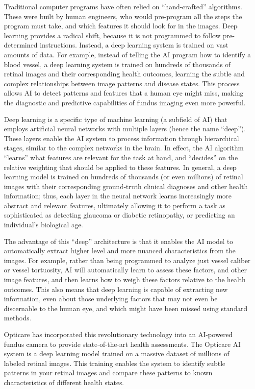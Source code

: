 \documentclass[
  Letterpaper,
]{scrbook}
\begin{document}
Traditional computer programs have often relied on ``hand-crafted''
algorithms. These were built by human engineers, who would pre-program
all the steps the program must take, and which features it should look
for in the images. Deep learning provides a radical shift, because it is
not programmed to follow pre-determined instructions. Instead, a deep
learning system is trained on vast amounts of data. For example, instead
of telling the AI program how to identify a blood vessel, a deep
learning system is trained on hundreds of thousands of retinal images
and their corresponding health outcomes, learning the subtle and complex
relationships between image patterns and disease states. This process
allows AI to detect patterns and features that a human eye might miss,
making the diagnostic and predictive capabilities of fundus imaging even
more powerful.

Deep learning is a specific type of machine learning (a subfield of AI)
that employs artificial neural networks with multiple layers (hence the
name ``deep''). These layers enable the AI system to process information
through hierarchical stages, similar to the complex networks in the
brain. In effect, the AI algorithm ``learns'' what features are relevant
for the task at hand, and ``decides'' on the relative weighting that
should be applied to these features. In general, a deep learning model
is trained on hundreds of thousands (or even millions) of retinal images
with their corresponding ground-truth clinical diagnoses and other
health information; thus, each layer in the neural network learns
increasingly more abstract and relevant features, ultimately allowing it
to perform a task as sophisticated as detecting glaucoma or diabetic
retinopathy, or predicting an individual's biological age.

The advantage of this ``deep'' architecture is that it enables the AI
model to automatically extract higher level and more nuanced
characteristics from the images. For example, rather than being
programmed to analyze just vessel caliber or vessel tortuosity, AI will
automatically learn to assess these factors, and other image features,
and then learns how to weigh these factors relative to the health
outcomes. This also means that deep learning is capable of extracting
new information, even about those underlying factors that may not even
be discernable to the human eye, and which might have been missed using
standard methods.

Opticare has incorporated this revolutionary technology into an
AI-powered fundus camera to provide state-of-the-art health assessments.
The Opticare AI system is a deep learning model trained on a massive
dataset of millions of labeled retinal images. This training enables the
system to identify subtle patterns in your retinal images and compare
these patterns to known characteristics of different health states.
\end{document}
